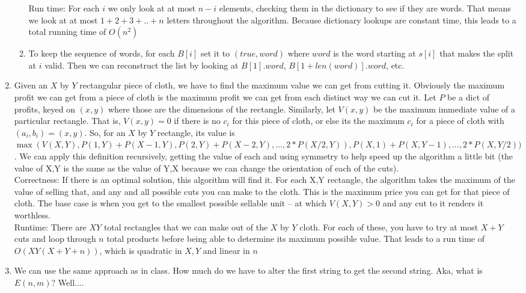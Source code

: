 \documentclass[11pt]{article}
\begin{document}
\begin{enumerate}
\begin{enumerate}
Run time: For each $i$ we only look at at most $n-i$ elements, checking them in the dictionary to see if they are words. That means we look at at most $1+2+3+..+n$ letters throughout the algorithm. Because dictionary lookups are constant time, this leads to a total running time of $O(n^2)$
\item To keep the sequence of words, for each $B[i]$ set it to $(true, word)$ where $word$ is the word starting at $s[i]$ that makes the split at $i$ valid. Then we can reconstruct the list by looking at $B[1].word$, $B[1+len(word)].word$, etc.
\end{enumerate}
\newpage
\item Given an $X$ by $Y$ rectangular piece of cloth, we have to find the maximum value we can get from cutting it. Obviously the maximum profit we can get from a piece of cloth is the maximum profit we can get from each distinct way we can cut it. Let $P$ be a dict of profits, keyed on $(x,y)$ where those are the dimensions of the rectangle. Similarly, let $V(x,y)$ be the maximum immediate value of a particular rectangle. That is, $V(x,y)=0$ if there is no $c_i$ for this piece of cloth, or else its the maximum $c_i$ for a piece of cloth with $(a_i,b_i)=(x,y)$. So, for an $X$ by $Y$ rectangle, its value is $\max(V(X,Y),P(1,Y)+P(X-1,Y),P(2,Y)+P(X-2,Y),... ,2*P(X/2,Y)),P(X,1)+P(X,Y-1),... ,2*P(X,Y/2))$. We can apply this definition recursively, getting the value of each and using symmetry to help speed up the algorithm a little bit (the value of X,Y is the same as the value of Y,X because we can change the orientation of each of the cuts).\\
Correctness: If there is an optimal solution, this algorithm will find it. For each X,Y rectangle, the algorithm takes the maximum of the value of selling that, and any and all possible cuts you can make to the cloth. This is the maximum price you can get for that piece of cloth. The base case is when you get to the smallest possible sellable unit -- at which $V(X,Y)>0$ and any cut to it renders it worthless. \\
Runtime: There are $XY$ total rectangles that we can make out of the $X$ by $Y$ cloth. For each of these, you have to try at most $X+Y$ cuts and loop through $n$ total products before being able to determine its maximum possible value. That leads to a run time of $O(XY(X+Y+n))$, which is quadratic in $X,Y$ and linear in $n$
\newpage
\item We can use the same approach as in class. How much do we have to alter the first string to get the second string. Aka, what is $E(n,m)$? Well.... \\

\end{enumerate}
\end{document}

